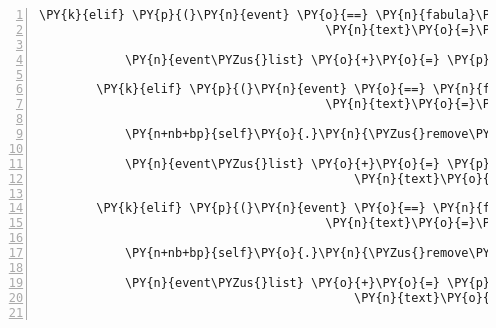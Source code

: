 \begin{Verbatim}[commandchars=\\\{\},numbers=left,firstnumber=1,stepnumber=1]
        \PY{k}{elif} \PY{p}{(}\PY{n}{event} \PY{o}{==} \PY{n}{fabula}\PY{o}{.}\PY{n}{SaysEvent}\PY{p}{(}\PY{n}{identifier}\PY{o}{=}\PY{n}{ID\PYZus{}CASSANDRA}\PY{p}{,}
                                        \PY{n}{text}\PY{o}{=}\PY{l+s}{\PYZsq{}}\PY{l+s}{Ich bin auf einer Reise, die mich durch den Zauberwald führt!}\PY{l+s}{\PYZsq{}}\PY{p}{)}\PY{p}{)}\PY{p}{:}

            \PY{n}{event\PYZus{}list} \PY{o}{+}\PY{o}{=} \PY{p}{[}\PY{n}{fabula}\PY{o}{.}\PY{n}{SaysEvent}\PY{p}{(}\PY{n}{identifier}\PY{o}{=}\PY{n}{ID\PYZus{}KUNI}\PY{p}{,} \PY{n}{text}\PY{o}{=}\PY{l+s}{\PYZsq{}}\PY{l+s}{Ich auch.}\PY{l+s}{\PYZsq{}}\PY{p}{)}\PY{p}{]}

        \PY{k}{elif} \PY{p}{(}\PY{n}{event} \PY{o}{==} \PY{n}{fabula}\PY{o}{.}\PY{n}{SaysEvent}\PY{p}{(}\PY{n}{identifier}\PY{o}{=}\PY{n}{ID\PYZus{}CASSANDRA}\PY{p}{,}
                                        \PY{n}{text}\PY{o}{=}\PY{l+s}{\PYZsq{}}\PY{l+s}{Ich habe einen sehr feinen klebrigen Spinnweb dabei.}\PY{l+s}{\PYZsq{}}\PY{p}{)}\PY{p}{)}\PY{p}{:}

            \PY{n+nb+bp}{self}\PY{o}{.}\PY{n}{\PYZus{}remove\PYZus{}sentence}\PY{p}{(}\PY{n}{ID\PYZus{}CASSANDRA}\PY{p}{,} \PY{n}{event}\PY{o}{.}\PY{n}{text}\PY{p}{)}

            \PY{n}{event\PYZus{}list} \PY{o}{+}\PY{o}{=} \PY{p}{[}\PY{n}{fabula}\PY{o}{.}\PY{n}{SaysEvent}\PY{p}{(}\PY{n}{identifier}\PY{o}{=}\PY{n}{ID\PYZus{}KUNI}\PY{p}{,}
                                            \PY{n}{text}\PY{o}{=}\PY{l+s}{\PYZsq{}}\PY{l+s}{Vielleicht kannst du damit deinen Flügel kleben?}\PY{l+s}{\PYZsq{}}\PY{p}{)}\PY{p}{]}

        \PY{k}{elif} \PY{p}{(}\PY{n}{event} \PY{o}{==} \PY{n}{fabula}\PY{o}{.}\PY{n}{SaysEvent}\PY{p}{(}\PY{n}{identifier}\PY{o}{=}\PY{n}{ID\PYZus{}CASSANDRA}\PY{p}{,}
                                        \PY{n}{text}\PY{o}{=}\PY{l+s}{\PYZsq{}}\PY{l+s}{Meine Flügel sind wieder heil, ich kann fliegen!}\PY{l+s}{\PYZsq{}}\PY{p}{)}\PY{p}{)}\PY{p}{:}

            \PY{n+nb+bp}{self}\PY{o}{.}\PY{n}{\PYZus{}remove\PYZus{}sentence}\PY{p}{(}\PY{n}{ID\PYZus{}CASSANDRA}\PY{p}{,} \PY{n}{event}\PY{o}{.}\PY{n}{text}\PY{p}{)}

            \PY{n}{event\PYZus{}list} \PY{o}{+}\PY{o}{=} \PY{p}{[}\PY{n}{fabula}\PY{o}{.}\PY{n}{SaysEvent}\PY{p}{(}\PY{n}{identifier}\PY{o}{=}\PY{n}{ID\PYZus{}KUNI}\PY{p}{,}
                                            \PY{n}{text}\PY{o}{=}\PY{l+s}{\PYZsq{}}\PY{l+s}{Juhu!}\PY{l+s}{\PYZsq{}}\PY{p}{)}\PY{p}{]}


\end{Verbatim}
